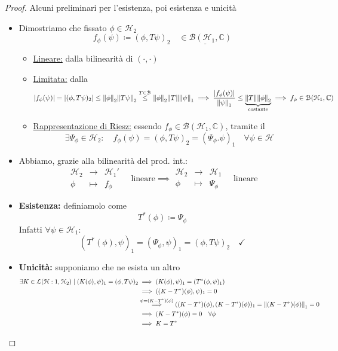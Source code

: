 \documentclass[a4paper,10pt]{article}
\theoremstyle{definition}
\newcommand{\im}{\mathbb{C}} %
\newcommand{\hil}{\mathcal{H}} %
\theoremstyle{indentdefinition}
\theoremstyle{indenttheorem}
\theoremstyle{myremark}
\theoremstyle{indentgeneral}
\begin{document}
\begin{proof}
Alcuni preliminari per l'esistenza, poi esistenza e unicità
\begin{itemize}
    \item Dimostriamo che fissato $\phi\in\hil_2$
    $$f_\phi(\psi)\coloneqq(\phi,T\psi)_2\quad \underline{\in\mathcal{B}(\hil_1,\im)}$$
    \begin{itemize}
        \item \underline{Lineare:} dalla bilinearità di $(\cdot,\cdot)$
        \item \underline{Limitata:} dalla 
        $$\abs{f_\phi(\psi)}=\abs{(\phi,T\psi)_2}\le \norm{\phi}_2\norm{T\psi}_2\overset{T\in\mathcal{B}}{\le}\norm{\phi}_2\norm{T}\norm{\psi}_1\implies\frac{\abs{f_\phi(\psi)}}{\norm{\psi}_1}\le \underbrace{\norm{T}\norm{\phi}_2}_{\text{costante}}\implies f_\phi \in\mathcal{B}(\hil_1,\im)$$
        \item \underline{Rappresentazione di Riesz:} essendo $f_\phi\in\mathcal{B}(\hil_1,\im)$, tramite il   
        $$\exists \Psi_\phi\in\hil_2: \quad f_\phi(\psi)=(\phi,T\psi)_2=(\Psi_\phi.\psi)_1\quad \forall\psi\in\hil$$
    \end{itemize}
    \item Abbiamo, grazie alla bilinearità del prod. int.:
    $$\begin{array}{ccc}
        \hil_2 &\to & \hil_1'  \\
         \phi&\mapsto& f_\phi 
    \end{array}\quad \text{lineare}\implies \begin{array}{ccc}
        \hil_2 &\to & \hil_1  \\
         \phi&\mapsto& \Psi_\phi 
    \end{array}\quad \text{lineare}$$
    \item \textbf{Esistenza:} definiamolo come 
    $$T^*(\phi)\coloneqq\Psi_\phi$$
    Infatti $\forall \psi\in\hil_1$:
    $$(T^*(\phi),\psi)_1=(\Psi_\phi,\psi)_1=(\phi,T\psi)_2\quad \checkmark$$
    \item \textbf{Unicità:} supponiamo che ne esista un altro
    \begin{align*}
        \exists K\in\mathcal{L}(\hil:1,\hil_2)\mid (K(\phi),\psi)_1=(\phi,T\psi)_2&\implies(K(\phi),\psi)_1=(T^*(\phi,\psi)_1)\\
        &\implies((K-T^*)(\phi),\psi)_1=0 \\
        &\overset{\psi=(K-T^*)(\phi)}{\implies}((K-T^*)(\phi),(K-T^*)(\phi))_1=\norm{(K-T^*)(\phi)}_1=0 \\
        &\implies (K-T^*)(\phi) =0 \quad \forall\phi\\
        &\implies K=T^*
    \end{align*}
\end{itemize}
\end{proof}
\end{document}
